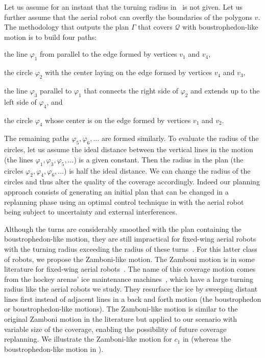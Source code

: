 Let us assume for an instant that the turning radius in~ is not given. Let us further assume that the aerial robot can overfly the boundaries of the polygons $v$. The methodology that outputs the plan $\Gamma$ that covers $\mathcal{Q}$ with boustrophedon-like motion is to build four paths:
\begin{enumerate*}[label={(\alph*)},font={\textit}]
  \item the line $\varphi_1$ from  parallel to the edge formed by vertices $v_1$ and $v_4$,
  \item the circle $\varphi_2$ with the center laying on the edge formed by vertices $v_4$ and $v_3$,
  \item the line $\varphi_3$ parallel to $\varphi_1$ that connects the right side of $\varphi_2$ and extends up to the left side of $\varphi_4$, and
  \item the circle $\varphi_4$ whose center is on the edge formed by vertices $v_1$ and $v_2$.
\end{enumerate*}
The remaining paths $\varphi_5,\varphi_6,\dots$ are formed similarly. To evaluate the radius of the circles, let us assume the ideal distance between the vertical lines in the motion (the lines $\varphi_1,\varphi_3,\varphi_5,\dots$) is a given constant. Then the radius in the plan (the circles $\varphi_2,\varphi_4,\varphi_6,\dots$) is half the ideal distance. We can change the radius of the circles and thus alter the quality of the coverage accordingly. Indeed our planning approach consists of generating an initial plan that can be changed in a replanning phase using an optimal control technique in  with the aerial robot being subject to uncertainty and external interferences.

Although the turns are considerably smoothed with the plan containing the boustrophedon-like motion, they are still impractical for fixed-wing aerial robots with the turning radius exceeding the radius of these turns~\citep{dille2013efficient,xu2011optimal,xu2014efficient}. For this latter class of robots, we propose the Zamboni-like motion. The Zamboni motion is in some literature for fixed-wing aerial robots~\citep{ablavsky2000optimal,araujo2013multiple,majeed2019new}. The name of this coverage motion comes from the hockey arenas' ice maintenance machines~\citep{araujo2013multiple,dille2013efficient,ablavsky2000optimal}, which have a large turning radius like the aerial robots we study. They resurface the ice by sweeping distant lines first instead of adjacent lines in a back and forth motion (the boustrophedon or boustrophedon-like motions). 
The Zamboni-like motion is similar to the original Zamboni motion in the literature but applied to our scenario with variable size of the coverage, enabling the possibility of future coverage replanning. We illustrate the Zamboni-like motion for $c_1$ in  (whereas the boustrophedon-like motion in ).

